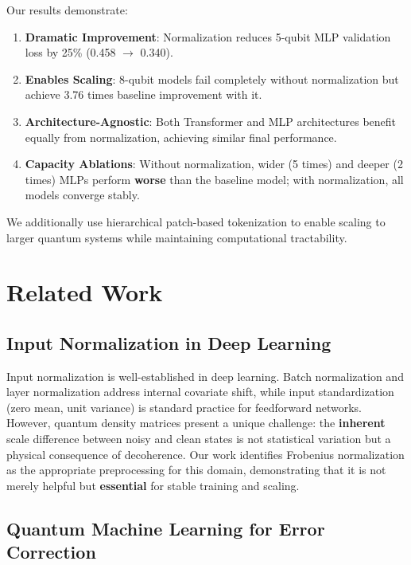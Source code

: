 \documentclass[11pt]{article}
\begin{document}
Our results demonstrate:
\begin{enumerate}
\item \textbf{\textbf{Dramatic Improvement}}: Normalization reduces 5-qubit MLP validation loss by 25\% (0.458 \(\to\) 0.340).
\item \textbf{\textbf{Enables Scaling}}: 8-qubit models fail completely without normalization but achieve 3.76 times baseline improvement with it.
\item \textbf{\textbf{Architecture-Agnostic}}: Both Transformer and MLP architectures benefit equally from normalization, achieving similar final performance.
\item \textbf{\textbf{Capacity Ablations}}: Without normalization, wider (5 times) and deeper (2 times) MLPs perform \textbf{worse} than the baseline model; with normalization, all models converge stably.
\end{enumerate}

We additionally use hierarchical patch-based tokenization to enable scaling to larger quantum systems while maintaining computational tractability.

\section{Related Work}
\label{sec:org27a2100}

\subsection{Input Normalization in Deep Learning}
\label{sec:orgf607576}

Input normalization is well-established in deep learning. Batch normalization \autocite{ioffe2015batch} and layer normalization \autocite{ba2016layer} address internal covariate shift, while input standardization (zero mean, unit variance) is standard practice for feedforward networks. However, quantum density matrices present a unique challenge: the \textbf{inherent} scale difference between noisy and clean states is not statistical variation but a physical consequence of decoherence. Our work identifies Frobenius normalization as the appropriate preprocessing for this domain, demonstrating that it is not merely helpful but \textbf{essential} for stable training and scaling.

\subsection{Quantum Machine Learning for Error Correction}
\label{sec:org35630c4}
\end{document}
